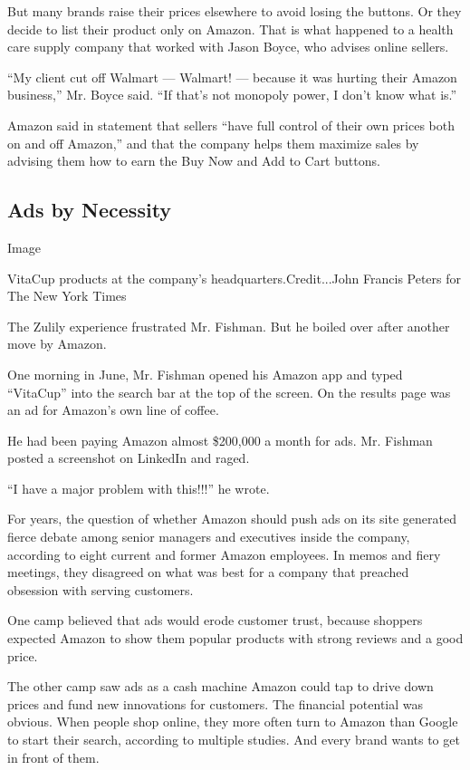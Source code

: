 But many brands raise their prices elsewhere to avoid losing the
buttons. Or they decide to list their product only on Amazon. That is
what happened to a health care supply company that worked with Jason
Boyce, who advises online sellers.

``My client cut off Walmart --- Walmart! --- because it was hurting
their Amazon business,'' Mr. Boyce said. ``If that's not monopoly power,
I don't know what is.''

Amazon said in statement that sellers ``have full control of their own
prices both on and off Amazon,'' and that the company helps them
maximize sales by advising them how to earn the Buy Now and Add to Cart
buttons.

\hypertarget{ads-by-necessity}{%
\subsection{Ads by Necessity}\label{ads-by-necessity}}

Image

VitaCup products at the company's headquarters.Credit...John Francis
Peters for The New York Times

The Zulily experience frustrated Mr. Fishman. But he boiled over after
another move by Amazon.

One morning in June, Mr. Fishman opened his Amazon app and typed
``VitaCup'' into the search bar at the top of the screen. On the results
page was an ad for Amazon's own line of coffee.

He had been paying Amazon almost \$200,000 a month for ads. Mr. Fishman
posted a screenshot on LinkedIn and raged.

``I have a major problem with this!!!'' he wrote.

For years, the question of whether Amazon should push ads on its site
generated fierce debate among senior managers and executives inside the
company, according to eight current and former Amazon employees. In
memos and fiery meetings, they disagreed on what was best for a company
that preached obsession with serving customers.

One camp believed that ads would erode customer trust, because shoppers
expected Amazon to show them popular products with strong reviews and a
good price.

The other camp saw ads as a cash machine Amazon could tap to drive down
prices and fund new innovations for customers. The financial potential
was obvious. When people shop online, they more often turn to Amazon
than Google to start their search, according to multiple studies. And
every brand wants to get in front of them.


